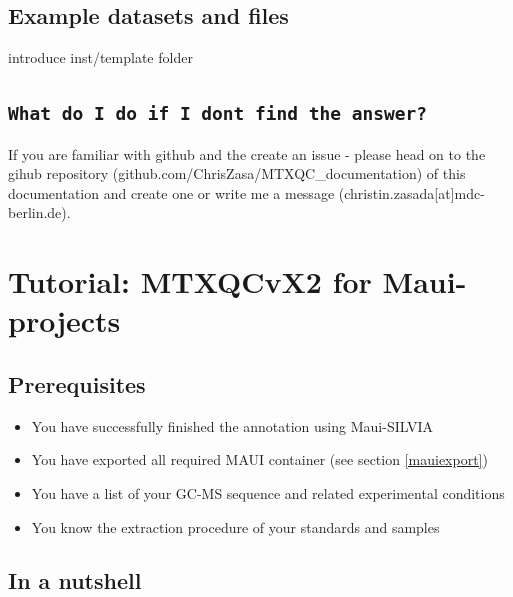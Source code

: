 \documentclass[]{book}
\providecommand{\tightlist}{%
  \setlength{\itemsep}{0pt}\setlength{\parskip}{0pt}}
\theoremstyle{definition}
\theoremstyle{definition}
\theoremstyle{definition}
\theoremstyle{remark}
\begin{document}
\section{Example datasets and files}\label{example-datasets-and-files}

introduce inst/template folder

\section{\texorpdfstring{\texttt{What\ do\ I\ do\ if\ I\ don\textquotesingle{}t\ find\ the\ answer?}}{What do I do if I don't find the answer?}}\label{what-do-i-do-if-i-dont-find-the-answer}

If you are familiar with github and the create an issue - please head on
to the gihub repository (github.com/ChrisZasa/MTXQC\_documentation) of
this documentation and create one or write me a message
(christin.zasada{[}at{]}mdc-berlin.de).

\chapter{Tutorial: MTXQCvX2 for Maui-projects}\label{maui}

\section{Prerequisites}\label{prerequisites}

\begin{itemize}
\tightlist
\item
  You have successfully finished the annotation using Maui-SILVIA
\item
  You have exported all required MAUI container (see section
  \ref{mauiexport})
\item
  You have a list of your GC-MS sequence and related experimental
  conditions
\item
  You know the extraction procedure of your standards and samples
\end{itemize}

\section{In a nutshell}\label{nutshellmaui}
\end{document}
